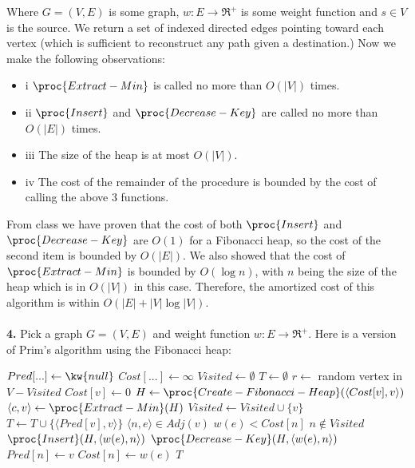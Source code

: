 \documentclass{article}
\begin{document}
Where $G = (V,E)$ is some graph, $w : E \rightarrow \Re^+$ is some weight function and $s \in V$ is the source.  We return a set of indexed directed edges pointing toward each vertex (which is sufficient to reconstruct any path given a destination.)  Now we make the following observations:

\begin{itemize}
\item{i} $\proc{Extract-Min}$ is called no more than $O(|V|)$ times.
\item{ii} $\proc{Insert}$ and $\proc{Decrease-Key}$ are called no more than $O(|E|)$ times.
\item{iii} The size of the heap is at most $O(|V|)$.
\item{iv} The cost of the remainder of the procedure is bounded by the cost of calling the above 3 functions.
\end{itemize}

From class we have proven that the cost of both $\proc{Insert}$ and $\proc{Decrease-Key}$ are $O(1)$ for a Fibonacci heap, so the cost of the second item is bounded by $O(|E|)$.  We also showed that the cost of $\proc{Extract-Min}$ is bounded by $O(\log{n})$, with $n$ being the size of the heap which is in $O(|V|)$ in this case.  Therefore, the amortized cost of this algorithm is within $O(|E| + |V| \log{|V|})$.

\paragraph{} \textbf{4.}
Pick a graph $G = (V,E)$ and weight function $w : E \rightarrow \Re^+$.  Here is a version of Prim's algorithm using the Fibonacci heap:

\begin{codebox}
\li $Pred[...] \gets \kw{null}$
\li $Cost[...] \gets \infty$
\li $Visited \gets \emptyset$
\li	$T \gets \emptyset$
\li {}
\li		\Do $r \gets $ random vertex in $V - Visited$
\li		$Cost[v] \gets 0$
\li		$H \gets \proc{Create-Fibonacci-Heap}(\langle Cost[v], v \rangle)$
\li		{}
\li			\Do $\langle c, v \rangle \gets \proc{Extract-Min}(H)$
\li			{} 
\li			$Visited \gets Visited \cup \{ v \}$
\li			{} $T \gets T \cup \{ \langle Pred[v], v \rangle \}$
\li			\For {} $\langle n, e \rangle \in Adj(v)$  $w(e) < Cost[n]$  $n \not \in Visited$
\li				\Do {} 
\li					\Then $\proc{Insert}(H, \langle w(e), n \rangle)$
\li					\Else $\proc{Decrease-Key}(H, \langle w(e), n \rangle)$
					\End
\li				$Pred[n] \gets v$
\li				$Cost[n] \gets w(e)$
				\End
			\End
		\End
\li \Return $T$
\end{codebox}
\end{document}
